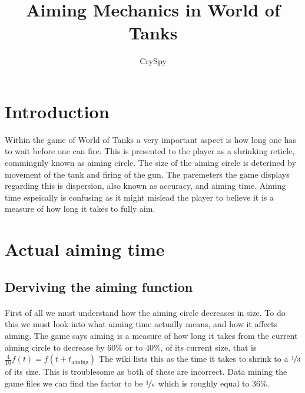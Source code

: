 \documentclass{article}
\title{Aiming Mechanics in World of Tanks}
\author{CrySpy}
\begin{document}
\maketitle
\tableofcontents
\pagebreak
\section{Introduction}
Within the game of World of Tanks a very important aspect is how long one has to wait
before one can fire. This is presented to the player as a shrinking reticle, commingnly known as aiming circle.
The size of the aiming circle is deterined by movement of the tank and firing of the gun.
The paremeters the game displays regarding this is dispersion, also known as accuracy,
and aiming time. Aiming time espeically is confusing as it might mislead the player to believe
it is a measure of how long it takes to fully aim. 

\section{Actual aiming time}
\subsection{Derviving the aiming function}

\paragraph{}First of all we must understand how the aiming circle decreases in size. 
To do this we must look into what aiming time actually means, and how it affects aiming.
The game says aiming is a measure of how long it takes from the current aiming circle
to decrease by 60\% or to 40\%, of its current size, that is \(\frac{4}{10}f(t)=f(t+t_{\mathrm{aiming}})\)
The wiki lists this as the time it takes to shrink to a \(\nicefrac{1}{3}\) of its size.
This is troublesome as both of these are incorrect. Data mining the game files we can find the factor
to be \(\nicefrac{1}{e}\) which is roughly equal to 36\%.
\end{document}

